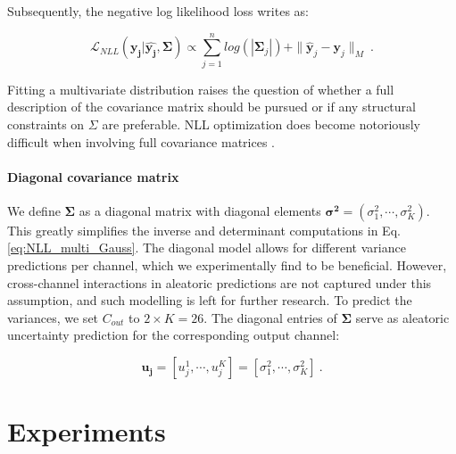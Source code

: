 \documentclass[10pt,twocolumn,letterpaper]{article}
\newcommand{\equaref}[1]{ Eq. \ref{#1}}
\begin{document}
Subsequently, the negative log likelihood loss writes as:

\begin{equation}
\mathcal{L}_{NLL}(\boldsymbol{y_j}|\boldsymbol{\hat{y_j}},\boldsymbol{\Sigma})  \varpropto \sum_{j=1}^{n} 
log(|\boldsymbol{\Sigma}_j|) + \|\boldsymbol{\hat{y}}_j - \boldsymbol{y}_j \|_M    \: .
\label{eq:NLL_multi_Gauss}
\end{equation}

Fitting a multivariate distribution raises the question of whether a full description of the covariance matrix should be pursued or if any structural constraints on $\Sigma$ are preferable. NLL optimization does become notoriously difficult when involving full covariance matrices \cite{skafte2019reliable, seitzer2021pitfalls}. 

\paragraph{\bf Diagonal covariance matrix} We define $\boldsymbol{\Sigma}$ as a diagonal matrix with diagonal elements $\boldsymbol{\sigma^2}= (\sigma_1^2, \cdots,\sigma_K^2) $. This greatly simplifies the inverse and determinant computations in \equaref{eq:NLL_multi_Gauss}. The diagonal model allows for different variance predictions per channel, which we experimentally find to be beneficial. However, cross-channel interactions in aleatoric predictions are not captured under this assumption, and such modelling is left for further research. To predict the variances, we set $C_{out}$ to $2\times K = 26$.
The diagonal entries of  $\boldsymbol{\Sigma}$ serve as aleatoric uncertainty prediction for the corresponding output channel:

\begin{equation}
    \boldsymbol{u_j} = [u_j^1,\cdots, u_j^K] = [\sigma_1^2, \cdots,\sigma_K^2] \:.
\end{equation}


\section{Experiments}
\end{document}
